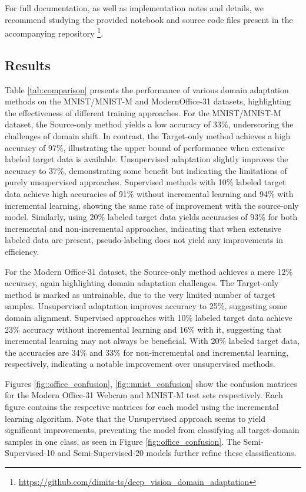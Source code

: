 \documentclass{article}
\begin{document}
	For full documentation, as well as implementation notes and details, we recommend studying the provided notebook and source code files present in the accompanying repository \footnote{\url{https://github.com/dimits-ts/deep\_vision\_domain\_adaptation}}.
	
	
	\subsection{Results}
	
	Table \ref{tab:comparison} presents the performance of various domain adaptation methods on the MNIST/MNIST-M and ModernOffice-31 datasets, highlighting the effectiveness of different training approaches. For the MNIST/MNIST-M dataset, the Source-only method yields a low accuracy of 33\%, underscoring the challenges of domain shift. In contrast, the Target-only method achieves a high accuracy of 97\%, illustrating the upper bound of performance when extensive labeled target data is available. Unsupervised adaptation slightly improves the accuracy to 37\%, demonstrating some benefit but indicating the limitations of purely unsupervised approaches. Supervised methods with 10\% labeled target data achieve high accuracies of 91\% without incremental learning and 94\% with incremental learning, showing the same rate of improvement with the source-only model. Similarly, using 20\% labeled target data yields accuracies of 93\% for both incremental and non-incremental approaches, indicating that when extensive labeled data are present, pseudo-labeling does not yield any improvements in efficiency.
	
	For the Modern Office-31 dataset, the Source-only method achieves a mere 12\% accuracy, again highlighting domain adaptation challenges. The Target-only method is marked as untrainable, due to the very limited number of target samples. Unsupervised adaptation improves accuracy to 25\%, suggesting some domain alignment. Supervised approaches with 10\% labeled target data achieve 23\% accuracy without incremental learning and 16\% with it, suggesting that incremental learning may not always be beneficial. With 20\% labeled target data, the accuracies are 34\% and 33\% for non-incremental and incremental learning, respectively, indicating a notable improvement over unsupervised methods. 
	
	Figures \ref{fig::office_confusion}, \ref{fig::mnist_confusion} show the confusion matrices for the Modern Office-31 Webcam and MNIST-M test sets respectively. Each figure contains the respective matrices for each model using the incremental learning algorithm. Note that the Unsupervised approach seems to yield significant improvements, preventing the model from classifying all target-domain samples in one class, as seen in Figure \ref{fig::office_confusion}. The Semi-Supervised-10 and Semi-Supervised-20 models further refine these classifications.
	
\end{document}
